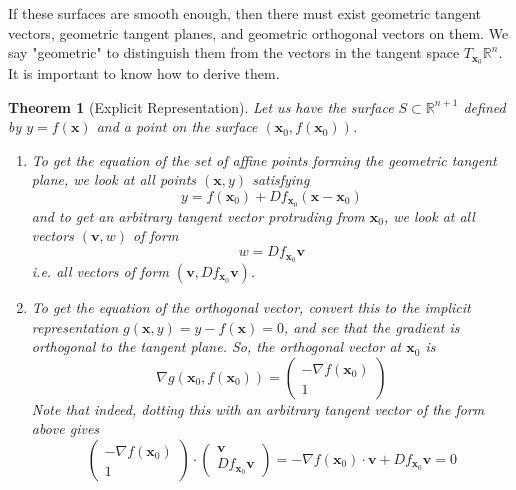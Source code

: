 \documentclass{article}
\newtheorem{theorem}{Theorem}[section]
\theoremstyle{remark}
\theoremstyle{definition}
\begin{document}
If these surfaces are smooth enough, then there must exist geometric tangent vectors, geometric tangent planes, and geometric orthogonal vectors on them. We say "geometric" to distinguish them from the vectors in the tangent space $T_{\mathbf{x}_0} \mathbb{R}^n$. It is important to know how to derive them. 

\begin{theorem}[Explicit Representation]
Let us have the surface $S \subset \mathbb{R}^{n+1}$ defined by $y = f(\mathbf{x})$ and a point on the surface $(\mathbf{x}_0, f(\mathbf{x}_0))$. 
\begin{enumerate}
    \item To get the equation of the set of affine points forming the geometric tangent plane, we look at all points $(\mathbf{x}, y)$ satisfying 
    \[y = f(\mathbf{x}_0) + D f_{\mathbf{x}_0} (\mathbf{x} - \mathbf{x}_0)\]
    and to get an arbitrary tangent vector protruding from $\mathbf{x}_0$, we look at all vectors $(\mathbf{v}, w)$ of form 
    \[w = D f_{\mathbf{x}_0} \mathbf{v}\]
    i.e. all vectors of form $(\mathbf{v}, D f_{\mathbf{x}_0} \mathbf{v})$. 
    \item To get the equation of the orthogonal vector, convert this to the implicit representation $g(\mathbf{x}, y) = y - f(\mathbf{x}) = 0$, and see that the gradient is orthogonal to the tangent plane. So, the orthogonal vector at $\mathbf{x}_0$ is 
    \[\nabla g (\mathbf{x}_0, f(\mathbf{x}_0)) = \begin{pmatrix} - \nabla f(\mathbf{x}_0) \\ 1 \end{pmatrix}\]
    Note that indeed, dotting this with an arbitrary tangent vector of the form above gives 
    \[\begin{pmatrix} -\nabla f(\mathbf{x}_0) \\ 1 \end{pmatrix} \cdot \begin{pmatrix} \mathbf{v} \\ D f_{\mathbf{x}_0} \mathbf{v} \end{pmatrix} = - \nabla f(\mathbf{x}_0) \cdot \mathbf{v} + D f_{\mathbf{x}_0} \mathbf{v} = 0\]
\end{enumerate}
\end{theorem}
\end{document}
